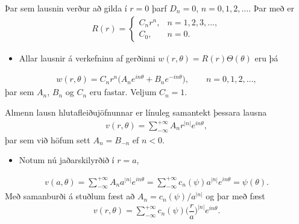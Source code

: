 \documentclass[a4paper,10pt,icelandic]{sphinxmanual}
\begin{document}
Þar sem lausnin verður að gilda í \(r=0\) þarf \(D_n=0\), \(n=0,1,2,\dots\). Þar með er
\begin{equation*}
\begin{split}R(r)=\begin{cases}
 C_nr^n, &n=1,2,3,\dots,\\
 C_0, &n=0.
 \end{cases}\end{split}
\end{equation*}\begin{itemize}
\item {} 
Allar lausnir á verkefninu af gerðinni \(w(r,\theta)=R(r)\Theta(\theta)\)  eru þá

\end{itemize}
\begin{equation*}
\begin{split}w(r,\theta)=
 C_nr^n\big(A_ne^{in\theta}+B_ne^{-in\theta}\big), \qquad n=0,1,2,\dots,\end{split}
\end{equation*}
þar sem \(A_n\), \(B_n\) og \(C_n\) eru fastar. Veljum \(C_n=1\).

Almenn lausn hlutafleiðujöfnunnar er línuleg samantekt þessara lausna
\begin{equation*}
\begin{split}v(r,\theta)=\sum\limits_{-\infty}^{+\infty}A_nr^{|n|}e^{in\theta},\end{split}
\end{equation*}
þar sem við höfum sett \(A_n=B_{-n}\) ef \(n<0\).
\begin{itemize}
\item {} 
Notum nú jaðarskilyrðið í \(r=a\),

\end{itemize}
\begin{equation*}
\begin{split}v(a,\theta)=\sum\limits_{-\infty}^{+\infty}A_na^{|n|}e^{in\theta}
 =\sum\limits_{-\infty}^{+\infty}c_n(\psi)a^{|n|}e^{in\theta}=\psi(\theta).\end{split}
\end{equation*}
Með samanburði á stuðlum fæst að \(A_n=c_n(\psi)/a^{|n|}\)
og þar með fæst
\begin{equation*}
\begin{split}v(r,\theta)=\sum\limits_{-\infty}^{+\infty}
 c_n(\psi)\bigg(\dfrac ra\bigg)^{|n|} e^{in\theta}.\end{split}
\end{equation*}
\end{document}
